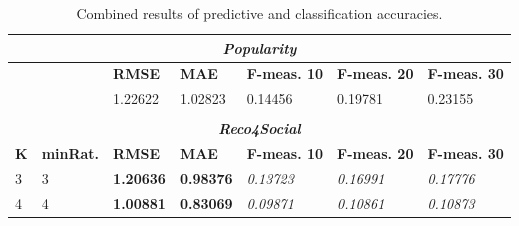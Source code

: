 \documentclass[12pt]{report}
\begin{document}
\begin{table}[hptb]
\centering
\caption{Combined results of predictive and classification accuracies.}
\label{table.eval.summary1}
\vspace{3mm}
\begin{tabular}{lllllll}
\hline
\multicolumn{7}{|c|}{{\bf \it Popularity}}                                                                                                                                                                                                                                            \\ \hline
\multicolumn{1}{|l|}{}        & \multicolumn{1}{l|}{}                         & \multicolumn{1}{l|}{{\bf RMSE}}    & \multicolumn{1}{l|}{{\bf MAE}}     & \multicolumn{1}{l|}{{\bf F-meas. 10}} & \multicolumn{1}{l|}{{\bf F-meas. 20}} & \multicolumn{1}{l|}{{\bf F-meas. 30}} \\ \hline
\multicolumn{1}{|l|}{}        & \multicolumn{1}{l|}{}                         & \multicolumn{1}{l|}{1.22622}       & \multicolumn{1}{l|}{1.02823}       & \multicolumn{1}{l|}{0.14456}            & \multicolumn{1}{l|}{0.19781}            & \multicolumn{1}{l|}{0.23155}            \\ \hline
                              &                                               &                                    &                                    &                                         &                                         &                                         \\ \hline
\multicolumn{7}{|c|}{{\bf \it Reco4Social}}                                                                                                                                                                                                                                           \\ \hline
\multicolumn{1}{|l|}{{\bf K}} & \multicolumn{1}{l|}{{\bf minRat.}} & \multicolumn{1}{l|}{{\bf RMSE}}    & \multicolumn{1}{l|}{{\bf MAE}}     & \multicolumn{1}{l|}{{\bf F-meas. 10}} & \multicolumn{1}{l|}{{\bf F-meas. 20}} & \multicolumn{1}{l|}{{\bf F-meas. 30}} \\ \hline
\multicolumn{1}{|l|}{3}       & \multicolumn{1}{l|}{3}                        & \multicolumn{1}{l|}{{\bf 1.20636}} & \multicolumn{1}{l|}{{\bf 0.98376}} & \multicolumn{1}{l|}{{\it 0.13723}}      & \multicolumn{1}{l|}{{\it 0.16991}}      & \multicolumn{1}{l|}{{\it 0.17776}}      \\ \hline
\multicolumn{1}{|l|}{4}       & \multicolumn{1}{l|}{4}                        & \multicolumn{1}{l|}{{\bf 1.00881}} & \multicolumn{1}{l|}{{\bf 0.83069}} & \multicolumn{1}{l|}{{\it 0.09871}}      & \multicolumn{1}{l|}{{\it 0.10861}}      & \multicolumn{1}{l|}{{\it 0.10873}}      \\ \hline

\end{tabular}
\end{table}
\end{document}
